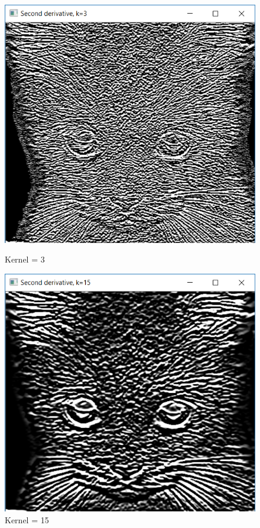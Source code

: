 \documentclass{article}
\begin{document}
\begin{figure}[h]
\begin{minipage}[b]{0.5\linewidth}
\centering
\includegraphics[scale=0.5]{2c1.PNG}
\caption{Kernel = 3}	
\end{minipage}
\begin{minipage}[b]{0.5\linewidth}
\centering
\includegraphics[scale=0.5]{2c2.PNG}
\caption{Kernel = 15}
\end{minipage}
\end{figure}
\end{document}
